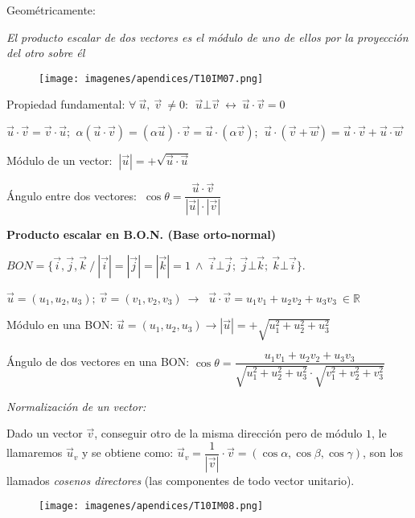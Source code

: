 \vspace{30mm} %
\begin{multicols}{2}
Geométricamente:

\emph{El producto escalar de dos vectores es el módulo de uno de ellos por la proyección del otro sobre él}
\begin{figure}[H]
	\centering
	\texttt{[image: imagenes/apendices/T10IM07.png]}
\end{figure}
\end{multicols}


	Propiedad fundamental: $\forall \  \vec u,\ \vec v\ \neq 0:\ \boxed{\  \vec u \bot \vec v \ \leftrightarrow \ \vec u \cdot \vec v=0 \ }$
		
	$\vec u \cdot \vec v = \vec v \cdot \vec u$; $\ \alpha ( \vec u \cdot \vec v) =( \alpha \vec u) \cdot \vec v = \vec u \cdot ( \alpha \vec v)$; $\ \vec u \cdot (\vec v + \vec w)= \vec u \cdot \vec v + \vec u \cdot \vec w$
		
	 Módulo de un vector: $\boxed{ \ | \vec u |=+\sqrt{\vec u \cdot \vec u} \ }$
		
	 Ángulo entre dos vectores: $\boxed{ \ \cos \theta = \dfrac {\vec u \cdot \vec v}{|\vec u| \cdot |\vec v|} \ }$
	 
\vspace{4mm} \textbf{Producto escalar en B.O.N. \small{(Base orto-normal)}}

$BON=\{ \vec i, \vec j, \vec k \ / \  |\vec i|=|\vec j|=|\vec k|=1 \ \wedge \ \vec i \bot \vec j; \ \vec j \bot \vec k; \ \vec k \bot \vec i \}$. 

$\vec u=(u_1,u_2,u_3); \ \vec v=(v_1, v_2, v_3) \ \to \ $
$\boxed{   \vec u \cdot \vec v= u_1 v_1+u_2 v_2+u_3 v_3  }  \ \in \mathbb{R}$

\vspace{2mm} Módulo en una BON: $ \vec u=(u_1,u_2,u_3) \to |\vec u|=+\sqrt{u_1^2+u_2^2+u_3^2}$
		
\vspace{2mm} Ángulo \small{de dos vectores en una BON:} $\cos \theta = \dfrac {u_1 v_1+u_2 v_2+u_3 v_3}{\sqrt{u_1^2+u_2^2+u_3^2}\cdot \sqrt{v_1^2+v_2^2+v_3^2}}$

\vspace{4mm}

\begin{multicols}{2}
\textit{Normalización de un vector:} 

Dado un vector $\vec v$, conseguir otro de la misma dirección pero de módulo $1$, le llamaremos $\vec u_v$ y se obtiene como: $\vec u_v=\dfrac {1}{|\vec v|}\cdot \vec v = (\cos \alpha, \cos \beta, \cos \gamma)$, son los llamados \textit{cosenos directores} (las componentes de todo vector unitario).
\begin{figure}[H]
	\centering
	\texttt{[image: imagenes/apendices/T10IM08.png]}
\end{figure}
\end{multicols}

